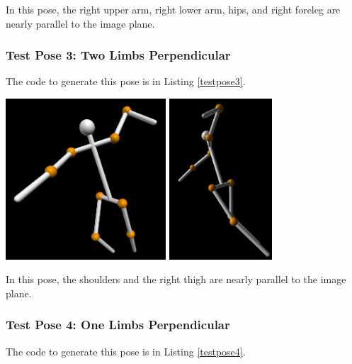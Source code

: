\documentclass[final]{article}
\begin{document}
\begin{spacing}{1.1}
In this pose, the right upper arm, right lower arm, hips, and right foreleg are nearly parallel to the image plane.

\subsubsection{Test Pose 3: Two Limbs Perpendicular}

The code to generate this pose is in Listing \ref{testpose3}. 

\begin{center}
  \includegraphics[height=6cm]{fig/testpose3.png}
  \includegraphics[height=6cm]{fig/testposeside3.png}
\end{center}

In this pose, the shoulders and the right thigh are nearly parallel to the image plane.

\subsubsection{Test Pose 4: One Limbs Perpendicular}

The code to generate this pose is in Listing \ref{testpose4}. 


\end{spacing}
\end{document}
